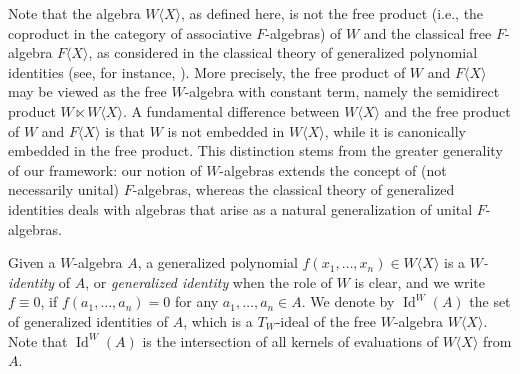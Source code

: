 \documentclass[reqno]{amsart}
\theoremstyle{definition}
\numberwithin{equation}{section}
\numberwithin{theorem}{section}
\newcommand{\W}{W\langle X\rangle}
\DeclareMathOperator{\I}{Id}
\begin{document}
    
Note that the algebra $\W$, as defined here, is not the free product (i.e., the coproduct in the category of associative  $F$-algebras) of $W$ and the classical free $F$-algebra $F\langle X \rangle$, as considered in the classical theory of generalized polynomial identities (see, for instance, \cite[Chapter 6]{BeidarMartindaleMikhalevm1996}).
More precisely, the free product of $W$ and $F\langle X \rangle$ may be viewed as the free $W$-algebra with constant term, namely the semidirect product $W \ltimes \W$. A fundamental difference between $\W$ and the free product of $W$ and $F\langle X \rangle$ is that $W$ is not embedded in $\W$, while it is canonically embedded in the free product. 
This distinction stems from the greater generality of our framework:
our notion of $W$-algebras extends the concept of (not necessarily unital) $F$-algebras, whereas the classical theory of generalized identities deals with algebras that arise as a natural generalization of unital $F$-algebras.


\smallskip 

Given a $W$-algebra $A$, a generalized polynomial $f(x_1, \dots , x_n)\in \W$ is a \emph{$W$-identity} of $A$, or \emph{generalized identity} when the role of $W$ is clear, and we write $f\equiv 0$, if $f(a_{1},\dots,a_{n})=0$ for any $a_1,\ldots,a_n\in A$. 
We denote by $\I^W(A)$ the set of generalized identities of $A$, which is a $T_W$-ideal of the free $W$-algebra $\W$. Note that $\I^W(A)$ is the intersection of all kernels of evaluations of $\W$ from $A$.



\smallskip
\end{document}
